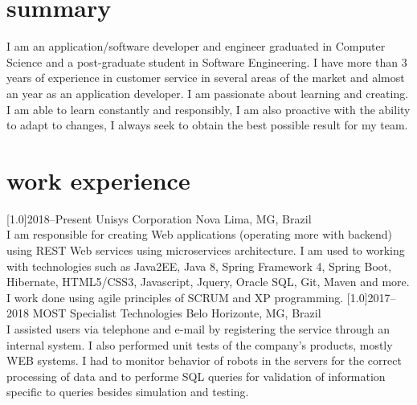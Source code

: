 \documentclass[portuguese]{cv-style}     %
\begin{document}
\section{summary}
  \vspace{-0.2cm}
I am an application/software developer and engineer graduated in Computer Science and a post-graduate student in Software Engineering. I have more than 3 years of experience in customer service in several areas of the market and almost an year as an application developer. I am passionate about learning and creating. I am able to learn constantly and responsibly, I am also proactive with the ability to adapt to changes, I always seek to obtain the best possible result for my team.
\section{work experience}
  \vspace{-0.2cm}
\begin{entrylist}
\entry
  {\scalebox{.8}[1.0]{2018--Present}}
  {Unisys Corporation}
  {Nova Lima, MG, Brazil}
  {\\
  I am responsible for creating Web applications (operating more with backend) using REST Web services using microservices architecture. I am used to working with technologies such as Java2EE, Java 8, Spring Framework 4, Spring Boot, Hibernate, HTML5/CSS3, Javascript, Jquery, Oracle SQL, Git, Maven and more. I work done using agile principles of SCRUM and XP programming.}
\vspace{-0.3cm}
\entry
  {\scalebox{.8}[1.0]{2017--2018}}
  {MOST Specialist Technologies}
  {Belo Horizonte, MG, Brazil}
  {\\
  I assisted users via telephone and e-mail by registering the service through an internal system. I also performed unit tests of the company's products, mostly WEB systems. I had to monitor behavior of robots in the servers for the correct processing of data and to performe SQL queries for validation of information specific to queries besides simulation and testing.}
\end{entrylist}

\end{document}
